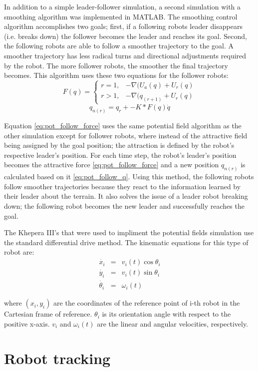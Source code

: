 In addition to a simple leader-follower simulation, a second simulation with a smoothing algorithm was implemented in MATLAB. The smoothing control algorithm accomplishes two goals; first, if a following robots leader disappears (i.e. breaks down) the follower becomes the leader and reaches its goal. Second, the following robots are able to follow a smoother trajectory to the goal. A smoother trajectory has less radical turns and directional adjustments required by the robot. The more follower robots, the smoother the final trajectory becomes. This algorithm uses these two equations for the follower robots:
\begin{equation} \label{eq:pot_follow_force}
	F(q) =
	\begin{cases}
		r=1, & -\nabla(U_a(q)+U_r(q) \\
		r>1, & -\nabla(q_{(r+1)}+U_r(q)
	\end{cases}
\end{equation}
\begin{equation} \label{eq:pot_follow_q}
	q_{n(r)}=q_r+-K*F(q)\dot{q}
\end{equation}

Equation \eqref{eq:pot_follow_force} uses the same potential field algorithm as the other simulation except for follower robots, where instead of the attractive field being assigned by the goal position; the attraction is defined by the robot's respective leader's position. For each time step, the robot's leader's position becomes the attractive force \eqref{eq:pot_follow_force} and a new position $q_{n(r)}$ is calculated based on it \eqref{eq:pot_follow_q}. Using this method, the following robots follow smoother trajectories because they react to the information learned by their leader about the terrain. It also solves the issue of a leader robot breaking down; the following robot becomes the new leader and successfully reaches the goal.

The Khepera III's that were used to impliment the potential fields simulation use the standard differential drive method. The kinematic equations for this type of robot are:
\begin{eqnarray} \label{eq:diff_drive}
	\dot{x_i} &=& v_i(t)\cos\theta_i\\
	\dot{y_i} &=& v_i(t)\sin\theta_i\\
	\dot{\theta_i} &=& \omega_i(t)
\end{eqnarray}

where $(x_i,y_i)$ are the coordinates of the reference point of i-th robot in the Cartesian frame of reference. $\theta_i$ is its orientation angle with respect to the positive x-axis. $v_i$ and $\omega_i(t)$ are the linear and angular velocities, respectively.

\section{Robot tracking}


